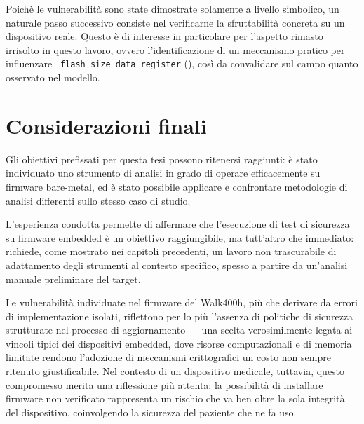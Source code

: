         Poichè le vulnerabilità sono state dimostrate solamente a livello 
        simbolico, un naturale passo successivo consiste nel verificarne la 
        sfruttabilità concreta su un dispositivo reale. Questo è di interesse 
        in particolare per l'aspetto rimasto irrisolto in questo lavoro, ovvero 
        l'identificazione di un meccanismo pratico per influenzare 
        \texttt{\_flash\_size\_data\_register} (), così da 
        convalidare sul campo quanto osservato nel modello.
    

    \section{Considerazioni finali}
    \label{subsec:considerazioni_finali}
     Gli obiettivi prefissati per questa tesi possono ritenersi raggiunti: 
    è stato individuato uno strumento di analisi in grado di operare 
    efficacemente su firmware bare-metal, ed è stato possibile applicare e 
    confrontare metodologie di analisi differenti sullo stesso caso di 
    studio.
    
    L'esperienza condotta permette di affermare che l'esecuzione di test di 
    sicurezza su firmware embedded è un obiettivo raggiungibile, ma tutt'altro 
    che immediato: richiede, come mostrato nei capitoli precedenti, un 
    lavoro non trascurabile di adattamento degli strumenti al contesto 
    specifico, spesso a partire da un'analisi manuale preliminare del 
    target.
    
    Le vulnerabilità individuate nel firmware del Walk400h, più che derivare 
    da errori di implementazione isolati, riflettono per lo più l'assenza 
    di politiche di sicurezza strutturate nel processo di aggiornamento — 
    una scelta verosimilmente legata ai vincoli tipici dei dispositivi 
    embedded, dove risorse computazionali e di memoria limitate rendono 
    l'adozione di meccanismi crittografici un costo non sempre ritenuto 
    giustificabile. Nel contesto di un dispositivo medicale, tuttavia, 
    questo compromesso merita una riflessione più attenta: la possibilità 
    di installare firmware non verificato rappresenta un rischio che va 
    ben oltre la sola integrità del dispositivo, coinvolgendo la sicurezza 
    del paziente che ne fa uso.
